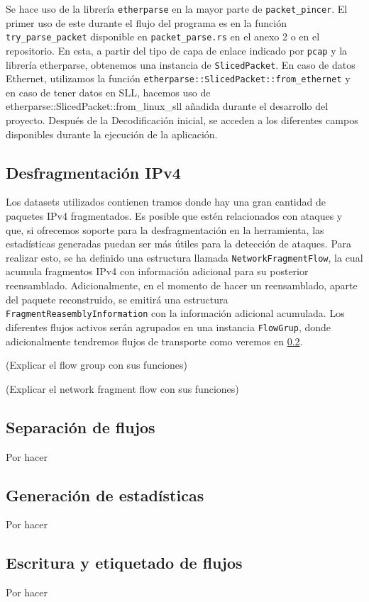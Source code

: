 Se hace uso de la librería \texttt{etherparse} en la mayor parte de \texttt{packet\_pincer}. El primer uso de este durante el flujo del programa es en la función \texttt{try\_parse\_packet} disponible en \texttt{packet\_parse.rs} en el anexo 2 o en el repositorio. En esta, a partir del tipo de capa de enlace indicado por \texttt{pcap} y la librería etherparse, obtenemos una instancia de \texttt{SlicedPacket}. En caso de datos Ethernet, utilizamos la función \texttt{etherparse::SlicedPacket::from\_ethernet} y en caso de tener datos en SLL, hacemos uso de {etherparse::SlicedPacket::from\_linux\_sll} añadida durante el desarrollo del proyecto. Después de la Decodificación inicial, se acceden a los diferentes campos disponibles durante la ejecución de la aplicación.

\subsection{Desfragmentación IPv4} \label{ipv4defrag}

Los datasets utilizados contienen tramos donde hay una gran cantidad de paquetes IPv4 fragmentados. Es posible que estén relacionados con ataques y que, si ofrecemos soporte para la desfragmentación en la herramienta, las estadísticas generadas puedan ser más útiles para la detección de ataques. Para realizar esto, se ha definido una estructura llamada \texttt{NetworkFragmentFlow}, la cual acumula fragmentos IPv4 con información adicional para su posterior reensamblado. Adicionalmente, en el momento de hacer un reensamblado, aparte del paquete reconstruido, se emitirá una estructura \texttt{FragmentReasemblyInformation} con la información adicional acumulada. Los diferentes flujos activos serán agrupados en una instancia \texttt{FlowGrup}, donde adicionalmente tendremos flujos de transporte como veremos en \ref{flowseparation}.



(Explicar el flow group con sus funciones)

(Explicar el network fragment flow con sus funciones)

\subsection{Separación de flujos} \label{flowseparation}

Por hacer

\subsection{Generación de estadísticas}

Por hacer

\subsection{Escritura y etiquetado de flujos}

Por hacer

